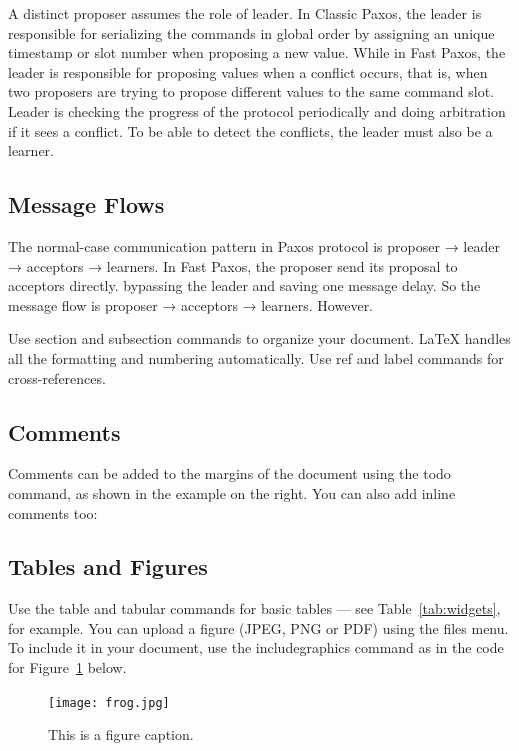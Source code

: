 \noindent A distinct proposer assumes the role of leader. In Classic Paxos, the leader is responsible for serializing the commands in global order by assigning an unique timestamp or slot number when proposing a new value. While in Fast Paxos, the leader is responsible for proposing values when a conflict occurs, that is, when two proposers are trying to propose different values to the same command slot. Leader is checking the progress of the protocol periodically and doing arbitration if it sees a conflict. To be able to detect the conflicts, the leader must also be a learner.    

\subsection{Message Flows}
\noindent The normal-case communication pattern in Paxos protocol is proposer → leader → acceptors → learners. In Fast Paxos, the proposer send its proposal to acceptors directly. bypassing the leader and saving one message delay. So the message flow is proposer → acceptors → learners. However. 
\\

\noindent 


Use section and subsection commands to organize your document. \LaTeX{} handles all the formatting and numbering automatically. Use ref and label commands for cross-references.

\subsection{Comments}

Comments can be added to the margins of the document using the  todo command, as shown in the example on the right. You can also add inline comments too:


\subsection{Tables and Figures}

Use the table and tabular commands for basic tables --- see Table~\ref{tab:widgets}, for example. You can upload a figure (JPEG, PNG or PDF) using the files menu. To include it in your document, use the includegraphics command as in the code for Figure~\ref{fig:frog} below.

\begin{figure}
\centering
\texttt{[image: frog.jpg]}
\caption{\label{fig:frog}This is a figure caption.}
\end{figure}

